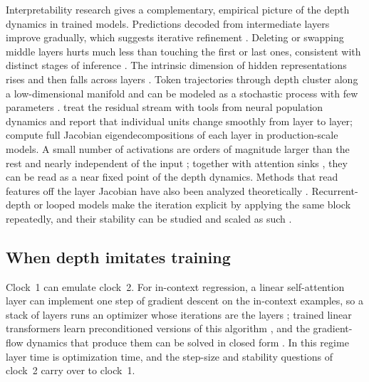 Interpretability research gives a complementary, empirical picture of the depth dynamics in trained models. Predictions decoded from intermediate layers improve gradually, which suggests iterative refinement \citep{belrose2023eliciting}. Deleting or swapping middle layers hurts much less than touching the first or last ones, consistent with distinct stages of inference \citep{lad2024remarkable}. The intrinsic dimension of hidden representations rises and then falls across layers \citep{valeriani2023geometry}. Token trajectories through depth cluster along a low-dimensional manifold and can be modeled as a stochastic process with few parameters \citep{sarfati2024lines}. \citet{fernando2025transformer} treat the residual stream with tools from neural population dynamics and report that individual units change smoothly from layer to layer; \citet{fernando2026dynamics} compute full Jacobian eigendecompositions of each layer in production-scale models. A small number of activations are orders of magnitude larger than the rest and nearly independent of the input \citep{sun2024massive}; together with attention sinks \citep{xiao2023efficient}, they can be read as a near fixed point of the depth dynamics. Methods that read features off the layer Jacobian have also been analyzed theoretically \citep{ostrow2026mathematical}. Recurrent-depth or looped models make the iteration explicit by applying the same block repeatedly, and their stability can be studied and scaled as such \citep{prairie2026parcae}.

\subsection{When depth imitates training}

Clock~1 can emulate clock~2. For in-context regression, a linear self-attention layer can implement one step of gradient descent on the in-context examples, so a stack of layers runs an optimizer whose iterations are the layers \citep{oswald2022transformers,akyurek2022learning,garg2022transformers}; trained linear transformers learn preconditioned versions of this algorithm \citep{ahn2023transformers}, and the gradient-flow dynamics that produce them can be solved in closed form \citep{zhang2023trained}. In this regime layer time is optimization time, and the step-size and stability questions of clock~2 carry over to clock~1.
